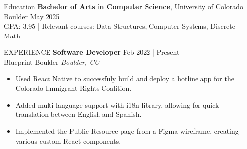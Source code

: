 \documentclass{resume} %
\begin{document}
\begin{rSection}{Education}
    {\bf Bachelor of Arts in Computer Science}, University of Colorado Boulder \hfill {May 2025}\\
    GPA: 3.95 | Relevant courses: Data Structures, Computer Systems, Discrete Math
\end{rSection}

\begin{rSection}{EXPERIENCE}
    \textbf{Software Developer} \hfill Feb 2022 | Present\\
    Blueprint Boulder \hfill \textit{Boulder, CO}
    \begin{itemize}
    \itemsep -3pt {} 
        \item Used React Native to successfuly build and deploy a hotline app for the Colorado Immigrant Rights Coalition. 
        \item Added multi-language support with i18n library, allowing for quick translation between English and Spanish.
        \item Implemented the Public Resource page from a Figma wireframe, creating various custom React components.
    \end{itemize}
\end{rSection}
\end{document}
